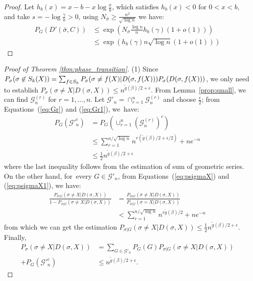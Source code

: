 \documentclass[entropy,article,accept,moreauthors,pdftex]{Definitions/mdpi}
\newcommand{\cG}{\mathcal{G}}
\newcommand{\1}{\mathbbm{1}}
\begin{document}
\begin{paracol}{2}
\begin{proof}
	Let $h_b(x) = x - b -x\log \frac{x}{b}$, which satisfies $h_b(x) < 0$ for $0<x<b$,
	and take $s=-\log\frac{\gamma}{b} > 0$, using 
	$N_{\bar{\sigma}} \geq \frac{n^2}{\sqrt{\log n}}$ we have:
	\begin{align*}
	P_G(D'(\bar{\sigma}, C))&\leq \exp( N_{\bar{\sigma}} \frac{\log n}{n} h_b(\gamma)(1+o(1))) \\
	& \leq \exp (h_b(\gamma) n \sqrt{\log n} (1+o(1)))
	\end{align*}
\end{proof}
\begin{proof}[Proof of Theorem \ref{thm:phase_transition}]
	(1) Since $P_{\sigma}(\sigma \not \in S_k(X)) = \sum_{f\in S_k} P_{\sigma}(\sigma \neq f(X) | D(\sigma, f(X)))\linebreak P_{\sigma}(D(\sigma, f(X)))$,
	we only need to establish $P_{\sigma}(\sigma \neq X | D(\sigma, X)) \leq  n^{\tilde{g}(\beta)/2 + \epsilon}$.
	From \mbox{Lemma \ref{prop:small}}, we can find $\cG_n^{(r)}$ for $r=1,\dots, n$.
	Let $\cG'_n = \cap_{r=1}^n \cG_n^{(r)}$ and choose $\frac{\epsilon}{2}$; from Equations~(\ref{eq:Gr}) and (\ref{eq:Gr1}), we~have:
	\begin{align*}
	P_G(\cG'^c_n) &= P_G(\cup_{r=1}^n (\cG_n^{(r)})^c) \\
	&\leq \sum_{r=1}^{n/\sqrt{\log n } } n^{r(\tilde{g}(\beta)/2 + \epsilon/2)}  + n e^{-n} \\
	& \leq \frac{1}{2} n^{\tilde{g}(\beta)/2 + \epsilon}
	\end{align*}
	where the last inequality follows from the estimation of sum of geometric series.
	On the other hand, for~every $G \in \cG'_n$, from Equations~(\ref{eq:psigmaX}) and (\ref{eq:psigmaX1}),
	we have:
	\begin{align*}
	\frac{P_{\sigma | G}(\sigma \neq X | D(\sigma, X))}{1-P_{\sigma | G}(\sigma \neq X | D(\sigma, X))} &= \frac{P_{\sigma | G}(\sigma \neq X | D(\sigma, X))}{P_{\sigma|G}(\sigma=X | D(\sigma, X))} \\
	&< \sum_{r=1}^{n/\sqrt{\log n }}  n^{r\tilde{g}(\beta)/2} + n e^{-n}
	\end{align*}
	from which we can get the estimation $P_{\sigma | G}(\sigma \neq X | D(\sigma, X))\leq \frac{1}{2}n^{\tilde{g}(\beta)/2 + \epsilon}$.
	Finally, 
	\begin{align*}
	P_{\sigma}(\sigma \neq X|D(\sigma, X)) &= \sum_{G\in \cG'_n} P_G(G)P_{\sigma |G}(\sigma \neq X | D(\sigma, X)) \\
	+ P_G(\cG'^c_n)
	& \leq n^{\tilde{g}(\beta)/2 + \epsilon}.
	\end{align*}
	

\end{proof}
\end{paracol}
\end{document}
